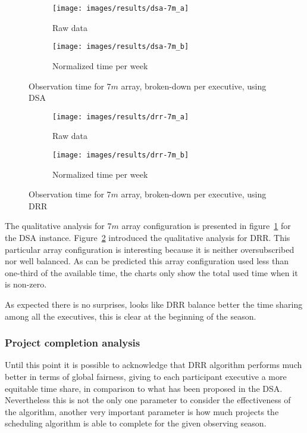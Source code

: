 \begin{figure}[t]
\centering
	\begin{subfigure}[b]{0.49\textwidth}
		\texttt{[image: images/results/dsa-7m\_a]}
        \caption{Raw data} 
    \end{subfigure} 
    \begin{subfigure}[b]{0.49\textwidth}
    		\texttt{[image: images/results/dsa-7m\_b]}
            \caption{Normalized time per week} 
    \end{subfigure}
    \caption{Observation time for $7m$ array, broken-down per executive, using DSA}
    \label{fig:dsa-7m-exec}
\end{figure}

\begin{figure}[t]
\centering
	\begin{subfigure}[b]{0.49\textwidth}
		\texttt{[image: images/results/drr-7m\_a]}
        \caption{Raw data} 
    \end{subfigure} 
    \begin{subfigure}[b]{0.49\textwidth}
    		\texttt{[image: images/results/drr-7m\_b]}
            \caption{Normalized time per week} 
    \end{subfigure}
    \caption{Observation time for $7m$ array, broken-down per executive, using DRR}
    \label{fig:drr-7m-exec}
\end{figure}

The qualitative analysis for $7m$ array configuration is presented in figure~\ref{fig:dsa-7m-exec} for the DSA instance. Figure~\ref{fig:drr-7m-exec} introduced the qualitative analysis for DRR. This particular array configuration is interesting because it is neither oversubscribed nor well balanced. As can be predicted this array configuration used less than one-third of the available time, the charts only show the total used time when it is non-zero.

As expected there is no surprises, looks like DRR balance better the time sharing among all the executives, this is clear at the beginning of the season. 

\subsubsection{Project completion analysis}

Until this point it is possible to acknowledge that DRR algorithm performs much better in terms of global fairness, giving to each participant executive a more equitable time share, in comparison to what has been proposed in the DSA. Nevertheless this is not the only one parameter to consider the effectiveness of the algorithm, another very important parameter is how much projects the scheduling algorithm is able to complete for the given observing season.

